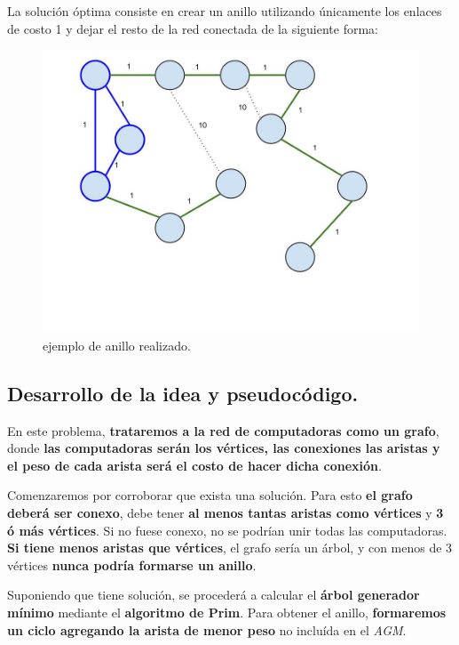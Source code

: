 La solución óptima consiste en crear un anillo utilizando únicamente los
enlaces de costo 1 y dejar el resto de la red conectada de la siguiente
forma:

\begin{figure}[htb]
  \begin{center}
      \includegraphics[scale=0.25]{imagenes/anillo-hecho.jpg}
  \end{center}
  \caption{ejemplo de anillo realizado.}
\end{figure}


\newpage
\subsection{Desarrollo de la idea y pseudocódigo.}

\vspace*{0.3cm}

En este problema, \textbf{trataremos a la red de computadoras como un grafo},
donde \textbf{las computadoras serán los vértices, las conexiones las aristas
y el peso de cada arista será el costo de hacer dicha conexión}.

Comenzaremos por corroborar que exista una solución. Para esto \textbf{el
grafo deberá ser conexo}, debe tener \textbf{al menos tantas aristas como
vértices} y \textbf{3 ó más vértices}. Si no fuese conexo, no se podrían
unir todas las computadoras. \textbf{Si tiene menos aristas que vértices},
el grafo sería un árbol, y con menos de 3 vértices \textbf{nunca podría formarse
un anillo}.

Suponiendo que tiene solución, se procederá a calcular el \textbf{árbol
generador mínimo} mediante el \textbf{algoritmo de Prim}. Para obtener el
anillo, \textbf{formaremos un ciclo agregando la arista de menor peso} no
incluída en el \textit{AGM}.


